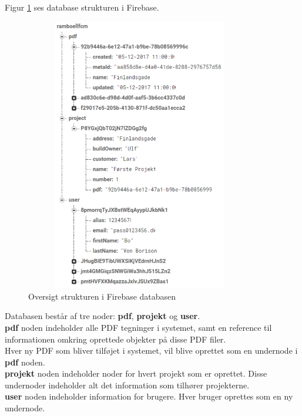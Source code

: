 Figur \ref{fig:FirebaseDB} ses database strukturen i Firebase. 
\begin{figure}[H] %
	\centering
	\includegraphics[height=12cm, width=10cm]{Design/Firebase/FirebaseDB}
	\caption{Oversigt strukturen i Firebase databasen}
	\label{fig:FirebaseDB}
\end{figure}
Databasen består af tre noder: \textbf{pdf}, \textbf{projekt} og \textbf{user}. \\
\textbf{pdf} noden indeholder alle PDF tegninger i systemet, samt en reference til informationen omkring oprettede objekter på disse PDF filer. \\
Hver ny PDF som bliver tilføjet i systemet, vil blive oprettet som en undernode i \textbf{pdf} noden. \\
\textbf{projekt} noden indeholder noder for hvert projekt som er oprettet. Disse undernoder indeholder alt det information som tilhører projekterne. \\
\textbf{user} noden indeholder information for brugere. Hver bruger oprettes som en ny undernode.

\clearpage